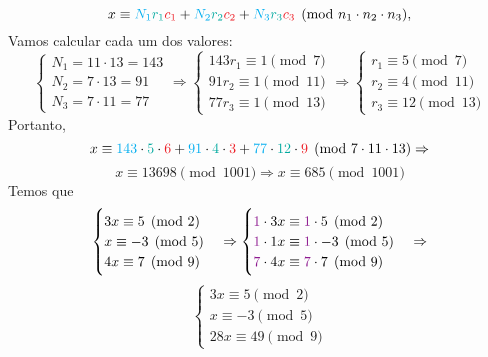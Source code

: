 \documentclass[12pt, a4paper]{article}
\newcommand{\negrito}[1]{\mbox{\boldmath{$#1$}}}
\newcommand{\alt}[1]{\textcolor{Floresta}{$\negrito{(#1)} $}}
\begin{document}
\begin{solution}
{ \[x \equiv \textcolor{Cyan}{N_1}\textcolor{Emerald}{r_1}\textcolor{Red}{c_1} + \textcolor{Cyan}{N_2}\textcolor{Emerald}{r_2}\textcolor{Red}{c_2} + \textcolor{Cyan}{N_3}\textcolor{Emerald}{r_3}\textcolor{Red}{c_3} \pmod{n_1 \cdot n_2 \cdot n_3},\]
Vamos calcular cada um dos valores:
        $$\left\{ \begin{array}{l}
             N_1 = 11\cdot13=143\\
             N_2 = 7\cdot13=91\\
             N_3 = 7\cdot11=77
        \end{array}\right.\Rightarrow
        \left\{ \begin{array}{l}
             143r_1 \equiv 1\pmod 7\\
             91r_2 \equiv 1\pmod{11}\\
             77r_3 \equiv 1\pmod{13}
        \end{array}\right. \Rightarrow 
        \left\{ \begin{array}{l}
             r_1 \equiv 5\pmod{7}\\
             r_2 \equiv 4\pmod{11}\\
             r_3 \equiv 12\pmod{13}
        \end{array}\right.$$
Portanto,
        $$x \equiv \textcolor{Cyan}{143}\cdot\textcolor{Emerald}{5}\cdot\textcolor{Red}{6}+\textcolor{Cyan}{91}\cdot\textcolor{Emerald}{4}\cdot\textcolor{Red}{3}+\textcolor{Cyan}{77}\cdot\textcolor{Emerald}{12}\cdot\textcolor{Red}{9}  \pmod{ 7\cdot11\cdot13} \Rightarrow$$
        $$x \equiv  13698 \pmod{1001} \Rightarrow \boxed{x \equiv 685 \pmod{1001}}$$
	\task[\alt{b}] Temos que
	\[
	\begin{cases}
	3x \equiv 5 \pmod{2} \\
	x \equiv -3 \pmod{5} \\
	4x \equiv 7 \pmod{9} 
	\end{cases} \Rightarrow 	\begin{cases}
	\textcolor{Plum}{1} \cdot 3x \equiv \textcolor{Plum}{1} \cdot 5 \pmod{2} \\
	\textcolor{Plum}{1} \cdot 1x \equiv \textcolor{Plum}{1} \cdot -3 \pmod{5} \\
	\textcolor{Plum}{7} \cdot 4x \equiv \textcolor{Plum}{7} \cdot 7 \pmod{9} 
	\end{cases} \Rightarrow \]\[	\begin{cases}
	3x \equiv 5 \pmod{2} \\
	x \equiv -3 \pmod{5} \\
	28x \equiv 49 \pmod{9} 

\end{cases}\]}
\end{solution}
\end{document}
